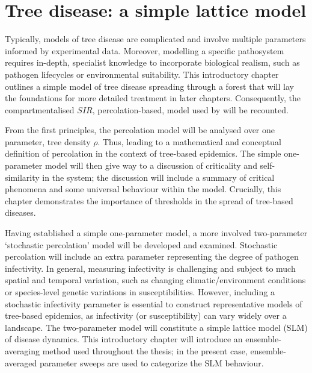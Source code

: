 
\chapter{Tree disease: a simple lattice model}
\label{chapter:SLM}

Typically, models of tree disease are complicated and involve multiple parameters informed by experimental data. Moreover, modelling a specific pathosystem requires in-depth, specialist knowledge to incorporate biological realism, such as pathogen lifecycles or environmental suitability. This introductory chapter outlines a simple model of tree disease spreading through a forest that will lay the foundations for more detailed treatment in later chapters.
Consequently, the compartmentalised $SIR$, percolation-based, model used by \cite{OROZCOFUENTES201912} will be recounted. 

From the first principles, the percolation model will be analysed over one parameter, tree density $\rho$.
Thus, leading to a mathematical and conceptual definition of percolation in the context of tree-based epidemics. 
The simple one-parameter model will then give way to a discussion of criticality and self-similarity in the system;
the discussion will include a summary of critical phenomena and some universal behaviour within the model.
Crucially, this chapter demonstrates the importance of thresholds in the spread of tree-based diseases.

Having established a simple one-parameter model, a more involved two-parameter `stochastic percolation' model will be developed and examined. 
Stochastic percolation will include an extra parameter representing the degree of pathogen infectivity. 
In general, measuring infectivity is challenging and subject to much spatial and temporal variation, such as changing climatic/environment conditions or species-level genetic variations in susceptibilities.  
However, including a stochastic infectivity parameter is essential to construct representative models of tree-based epidemics, as infectivity (or susceptibility) can vary widely over a landscape.
The two-parameter model will constitute a simple lattice model (SLM) of disease dynamics. 
This introductory chapter will introduce an ensemble-averaging method used throughout the thesis;
in the present case, ensemble-averaged parameter sweeps are used to categorize the SLM behaviour.


